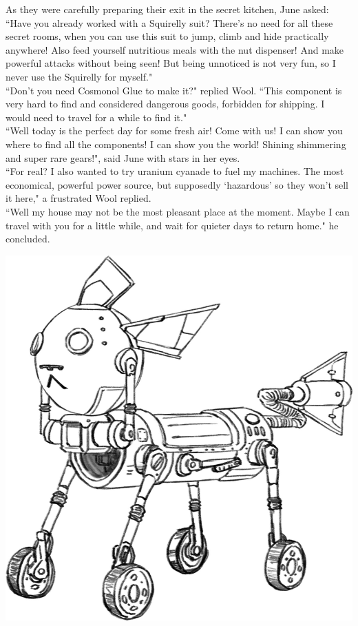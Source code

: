 As they were carefully preparing their exit in the secret kitchen, June asked:\\
``Have you already worked with a Squirelly suit? There’s no need for all these secret rooms, when you can use this suit to jump, climb and hide practically anywhere! Also feed yourself nutritious meals with the nut dispenser! And make powerful attacks without being seen! But being unnoticed is not very fun, so I never use the Squirelly for myself."\\
``Don’t you need Cosmonol Glue to make it?" replied Wool. ``This component is very hard to find and considered dangerous goods, forbidden for shipping. I would need to travel for a while to find it."\\
``Well today is the perfect day for some fresh air! Come with us! I can show you where to find all the components! I can show you the world! Shining shimmering and super rare gears!", said June with stars in her eyes.\\
``For real? I also wanted to try uranium cyanade to fuel my machines. The most economical, powerful power source, but supposedly ‘hazardous’ so they won’t sell it here," a frustrated Wool replied.\\
``Well my house may not be the most pleasant place at the moment. Maybe I can travel with you for a little while, and wait for quieter days to return home." he concluded.

\begin{center}
    \includegraphics[height=.2\textheight]{Assets/wfbw_liqueon}    
\end{center}

